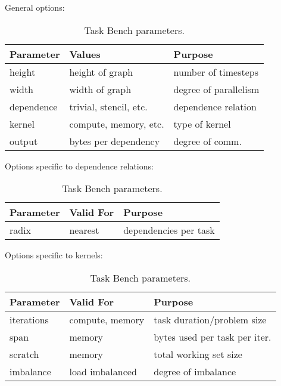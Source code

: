 \begin{table}[t]
\small

General options:

\vspace{0.25em}

\begin{tabular}{l | l | l}
Parameter & Values & Purpose \\
\hline

height & height of graph & number of timesteps \\
width & width of graph & degree of parallelism \\
dependence & trivial, stencil, etc. & dependence relation \\
kernel & compute, memory, etc. & type of kernel \\
output & bytes per dependency & degree of comm.
\end{tabular}

\vspace{1em}

Options specific to dependence relations:

\vspace{0.25em}

\begin{tabular}{l | l | l}
Parameter & Valid For & Purpose \\
\hline
radix & nearest & dependencies per task
\end{tabular}

\vspace{1em}

Options specific to kernels:

\vspace{0.25em}

\begin{tabular}{l | l | l}
Parameter & Valid For & Purpose \\
\hline
iterations & compute, memory & task duration/problem size \\
span & memory & bytes used per task per iter. \\
scratch & memory & total working set size \\
imbalance & load imbalanced & degree of imbalance
\end{tabular}

\caption{Task Bench parameters.\label{tab:parameters}}
\vspace{-0.5cm}
\end{table}
